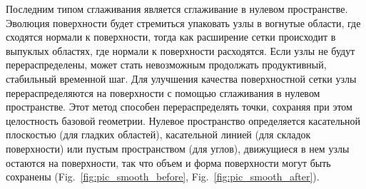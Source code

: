 Последним типом сглаживания является сглаживание в нулевом пространстве.
Эволюция поверхности будет стремиться упаковать узлы в вогнутые области, где сходятся нормали к поверхности, тогда как расширение сетки происходит в выпуклых областях, где нормали к поверхности расходятся.
Если узлы не будут перераспределены, может стать невозможным продолжать продуктивный, стабильный временной шаг.
Для улучшения качества поверхностной сетки узлы перераспределяются на поверхности с помощью сглаживания в нулевом пространстве.
Этот метод способен перераспределять точки, сохраняя при этом целостность базовой геометрии.
Нулевое пространство определяется касательной плоскостью (для гладких областей), касательной линией (для складок поверхности) или пустым пространством (для углов), движущиеся в нем узлы остаются на поверхности, так что объем и форма поверхности могут быть сохранены (Fig.~\ref{fig:pic_smooth_before}, Fig.~\ref{fig:pic_smooth_after}).